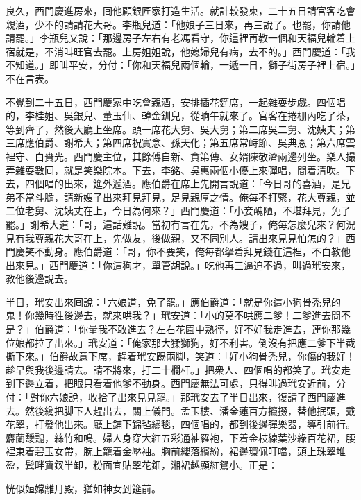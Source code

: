良久，西門慶進房來，囘他顧銀匠家打造生活。就計較發柬，二十五日請官客吃會親酒，少不的請請花大哥。李瓶兒道：「他娘子三日來，再三說了。也罷，你請他請罷。」李瓶兒又說：「那邊房子左右有老馮看守，你這裡再教一個和天福兒輪着上宿就是，不消叫旺官去罷。上房姐姐說，他媳婦兒有病，去不的。」{}西門慶道：「我不知道。」即叫平安，分付：「你和天福兒兩個輪，一遞一日，獅子街房子裡上宿。」不在言表。

不覺到二十五日，西門慶家中吃會親酒，安排插花筵席，一起雜耍步戲。四個唱的，李桂姐、吳銀兒、董玉仙、韓金釧兒，從晌午就來了。官客在捲棚內吃了茶，等到齊了，然後大廳上坐席。頭一席花大舅、吳大舅；第二席吳二舅、沈姨夫；第三席應伯爵、謝希大；第四席祝實念、孫天化；第五席常峙節、吳典恩；第六席雲裡守、白賚光。西門慶主位，其餘傅自新、賁第傳、女婿陳敬濟兩邊列坐。樂人撮弄雜耍數囘，就是笑樂院本。下去，李銘、吳惠兩個小優上來彈唱，間着清吹。下去，四個唱的出來，筵外遞酒。應伯爵在席上先開言說道：「今日哥的喜酒，是兄弟不當斗膽，請新嫂子出來拜見拜見，足見親厚之情。俺每不打緊，花大尊親，並二位老舅、沈姨丈在上，今日為何來？」西門慶道：「小妾醜陋，不堪拜見，免了罷。」謝希大道：「哥，這話難說。當初有言在先，不為嫂子，俺每怎麼兒來？何況見有我尊親花大哥在上，先做友，後做親，又不同別人。請出來見見怕怎的？」西門慶笑不動身。應伯爵道：「哥，你不要笑，俺每都拏着拜見錢在這裡，不白教他出來見。」西門慶道：「你這狗才，單管胡說。」吃他再三逼迫不過，叫過玳安來，教他後邊說去。

半日，玳安出來囘說：「六娘道，免了罷。」應伯爵道：「就是你這小狗骨禿兒的鬼！你幾時徃後邊去，就來哄我？」玳安道：「小的莫不哄應二爹！二爹進去問不是？」伯爵道：「你量我不敢進去？左右花園中熟徑，好不好我走進去，連你那幾位娘都拉了出來。」玳安道：「俺家那大猱獅狗，好不利害。倒沒有把應二爹下半截撕下來。」伯爵故意下席，趕着玳安踢兩脚，笑道：「好小狗骨禿兒，你傷的我好！趁早與我後邊請去。請不將來，打二十欄杆。」把衆人、四個唱的都笑了。玳安走到下邊立着，把眼只看着他爹不動身。西門慶無法可處，只得叫過玳安近前，分付：「對你六娘說，收拾了出來見見罷。」那玳安去了半日出來，復請了西門慶進去。然後纔把脚下人趕出去，關上儀門。孟玉樓、潘金蓮百方攛掇，替他抿頭，戴花翠，打發他出來。廳上鋪下錦毡繡毯，四個唱的，都到後邊彈樂器，導引前行。麝蘭靉靆，絲竹和鳴。婦人身穿大紅五彩通袖羅袍，下着金枝線葉沙綠百花裙，腰裡束着碧玉女帶，腕上籠着金壓袖。胸前纓落繽紛，裙邊環佩叮噹，頭上珠翠堆盈，鬂畔寶釵半卸，粉面宜貼翠花鈿，湘裙越顯紅鴛小。正是：

恍似姮嫦離月殿，猶如神女到筵前。

